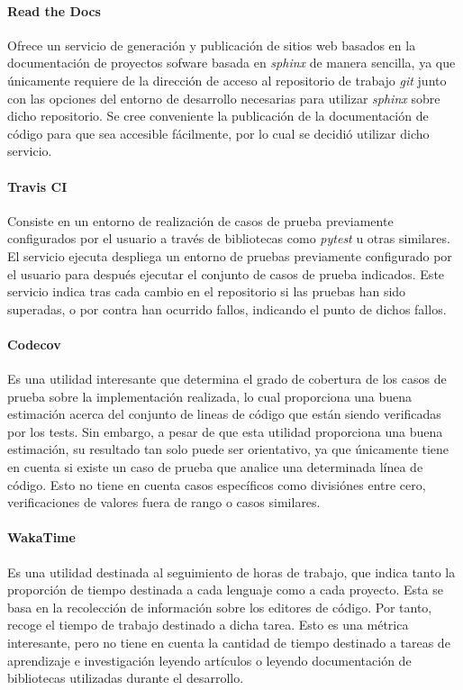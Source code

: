 \documentclass{subfiles}
\begin{document}
        \paragraph{Read the Docs}
        Ofrece un servicio de generación y publicación de sitios web basados en la documentación de proyectos sofware basada en \emph{sphinx} de manera sencilla, ya que únicamente requiere de la dirección de acceso al repositorio de trabajo \emph{git} junto con las opciones del entorno de desarrollo necesarias para utilizar \emph{sphinx} sobre dicho repositorio. Se cree conveniente la publicación de la documentación de código para que sea accesible fácilmente, por lo cual se decidió utilizar dicho servicio.

        \paragraph{Travis CI}
        Consiste en un entorno de realización de casos de prueba previamente configurados por el usuario a través de bibliotecas como \emph{pytest} u otras similares. El servicio ejecuta despliega un entorno de pruebas previamente configurado por el usuario para después ejecutar el conjunto de casos de prueba indicados. Este servicio indica tras cada cambio en el repositorio si las pruebas han sido superadas, o por contra han ocurrido fallos, indicando el punto de dichos fallos.

        \paragraph{Codecov}
        Es una utilidad interesante que determina el grado de cobertura de los casos de prueba sobre la implementación realizada, lo cual proporciona una buena estimación acerca del conjunto de lineas de código que están siendo verificadas por los tests. Sin embargo, a pesar de que esta utilidad proporciona una buena estimación, su resultado tan solo puede ser orientativo, ya que únicamente tiene en cuenta si existe un caso de prueba que analice una determinada línea de código. Esto no tiene en cuenta casos específicos como divisiónes entre cero, verificaciones de valores fuera de rango o casos similares.

        \paragraph{WakaTime}
        Es una utilidad destinada al seguimiento de horas de trabajo, que indica tanto la proporción de tiempo destinada a cada lenguaje como a cada proyecto. Esta se basa en la recolección de información sobre los editores de código. Por tanto, recoge el tiempo de trabajo destinado a dicha tarea. Esto es una métrica interesante, pero no tiene en cuenta la cantidad de tiempo destinado a tareas de aprendizaje e investigación leyendo artículos o leyendo documentación de bibliotecas utilizadas durante el desarrollo.
\end{document}
